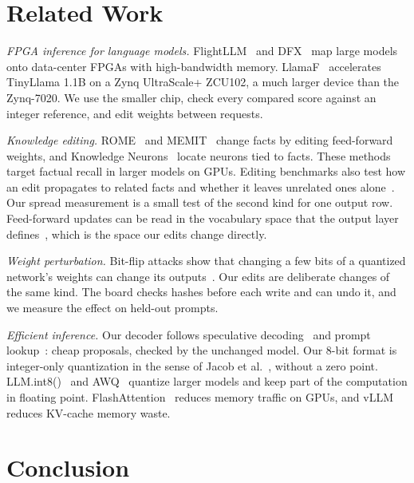 \documentclass[conference,10pt,letterpaper]{IEEEtran}
\newcommand{\eightbit}{\mbox{8-bit}}
\begin{document}
\section{Related Work}
\label{sec:related}

\emph{FPGA inference for language models.} FlightLLM~\cite{zeng2024flightllm} and DFX~\cite{hong2022dfx} map large models onto data-center FPGAs with high-bandwidth memory. LlamaF~\cite{xu2024llamaf} accelerates TinyLlama 1.1B on a Zynq UltraScale+ ZCU102, a much larger device than the Zynq-7020. We use the smaller chip, check every compared score against an integer reference, and edit weights between requests.

\emph{Knowledge editing.} ROME~\cite{meng2022rome} and MEMIT~\cite{meng2023memit} change facts by editing feed-forward weights, and Knowledge Neurons~\cite{dai2022neurons} locate neurons tied to facts. These methods target factual recall in larger models on GPUs. Editing benchmarks also test how an edit propagates to related facts and whether it leaves unrelated ones alone~\cite{cohen2024ripple}. Our spread measurement is a small test of the second kind for one output row. Feed-forward updates can be read in the vocabulary space that the output layer defines~\cite{geva2022ffn}, which is the space our edits change directly.

\emph{Weight perturbation.} Bit-flip attacks show that changing a few bits of a quantized network's weights can change its outputs~\cite{rakin2019bitflip}. Our edits are deliberate changes of the same kind. The board checks hashes before each write and can undo it, and we measure the effect on held-out prompts.

\emph{Efficient inference.} Our decoder follows speculative decoding~\cite{leviathan2023speculative} and prompt lookup~\cite{saxena2023prompt}: cheap proposals, checked by the unchanged model. Our \eightbit{} format is integer-only quantization in the sense of Jacob et al.~\cite{jacob2018quantization}, without a zero point. LLM.int8()~\cite{dettmers2022int8} and AWQ~\cite{lin2024awq} quantize larger models and keep part of the computation in floating point. FlashAttention~\cite{dao2022flashattention} reduces memory traffic on GPUs, and vLLM~\cite{kwon2023vllm} reduces KV-cache memory waste.

\section{Conclusion}
\label{sec:conclusion}
\end{document}
